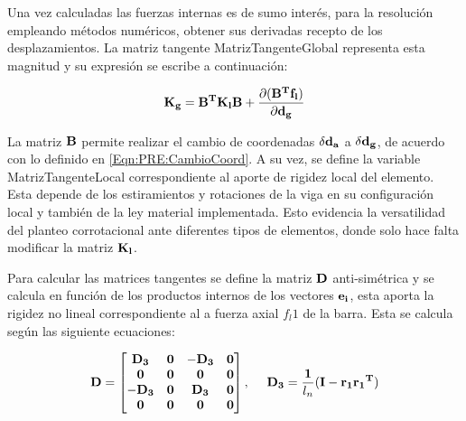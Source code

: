 Una vez calculadas las fuerzas internas es de sumo interés, para la resolución empleando métodos numéricos, obtener sus derivadas recepto de los desplazamientos. La matriz tangente \gls{MatrizTangenteGlobal} representa esta magnitud y su expresión se escribe a continuación:

\begin{equation}\label{Eqn:PRE:MatrizKest1}
\bf{K_g}=\bf{B}^T\bf{K_l}\bf{B}+\frac{\partial (\bf{B}^T\bf{f}_l)}{\partial \bf{d}_g}
\end{equation}


La matriz $\bf{B}$ permite realizar el cambio de coordenadas $\delta \bf{d_a}$ a  $\delta \bf{d_g}$, de acuerdo con lo definido en \eqref{Eqn:PRE:CambioCoord}. A su vez, se define la variable \gls{MatrizTangenteLocal} correspondiente al aporte de rigidez local del elemento. Esta depende de los estiramientos y rotaciones de la viga en su configuración local y también de la ley material implementada. Esto evidencia la versatilidad del planteo corrotacional ante diferentes tipos de elementos, donde solo hace falta modificar la matriz $\bf{K_l}$.

Para calcular las matrices tangentes se define la matriz  $\bf{D}$  anti-simétrica y se calcula en función de los productos internos de los vectores $\bf{e_i}$, esta aporta la rigidez no lineal correspondiente al a fuerza axial $f_l1$ de la barra. Esta se calcula según las siguiente ecuaciones:

\begin{equation}
	\label{Eqn:PRE:DefD}
	\bf{D}=\begin{bmatrix}
	\bf{D_3}& \bf{0}   & -\bf{D_3}   & \bf{0} \\
	\bf{0}  & \bf{0} & \bf{0}   & \bf{0}\\
	-\bf{D_3}  & \bf{0}   & \bf{D_3} & \bf{0} \\
	\bf{0}  & \bf{0}   & \bf{0}   & \bf{0}
\end{bmatrix},~~~~\bf{D_3}=\frac{1}{\text{$l_n$}}(\bf{I}-\bf{r_1}\bf{r_1}^T)
\end{equation}

